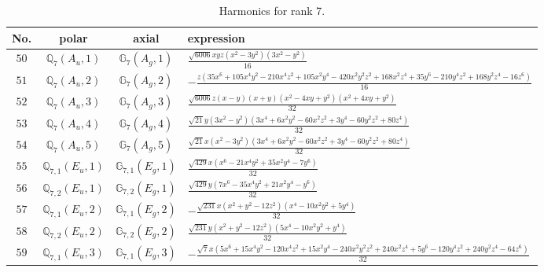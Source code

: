 \documentclass[fleqn,8pt,landscape]{jsarticle}
\begin{document}
\begin{table}[ht!]
\begin{center}
\caption{Harmonics for rank 7.}
\renewcommand{\arraystretch}{1.3}
\begin{tabular}{cccl} \hline \hline
No. & polar & axial & expression \\ \hline
$ 50 $ & $ \mathbb{Q}_{7}(A_{u},1) $ & $ \mathbb{G}_{7}(A_{g},1) $ & $ \frac{\sqrt{6006} x y z \left(x^{2} - 3 y^{2}\right) \left(3 x^{2} - y^{2}\right)}{16} $ \\
$ 51 $ & $ \mathbb{Q}_{7}(A_{u},2) $ & $ \mathbb{G}_{7}(A_{g},2) $ & $ - \frac{z \left(35 x^{6} + 105 x^{4} y^{2} - 210 x^{4} z^{2} + 105 x^{2} y^{4} - 420 x^{2} y^{2} z^{2} + 168 x^{2} z^{4} + 35 y^{6} - 210 y^{4} z^{2} + 168 y^{2} z^{4} - 16 z^{6}\right)}{16} $ \\
$ 52 $ & $ \mathbb{Q}_{7}(A_{u},3) $ & $ \mathbb{G}_{7}(A_{g},3) $ & $ \frac{\sqrt{6006} z \left(x - y\right) \left(x + y\right) \left(x^{2} - 4 x y + y^{2}\right) \left(x^{2} + 4 x y + y^{2}\right)}{32} $ \\
$ 53 $ & $ \mathbb{Q}_{7}(A_{u},4) $ & $ \mathbb{G}_{7}(A_{g},4) $ & $ \frac{\sqrt{21} y \left(3 x^{2} - y^{2}\right) \left(3 x^{4} + 6 x^{2} y^{2} - 60 x^{2} z^{2} + 3 y^{4} - 60 y^{2} z^{2} + 80 z^{4}\right)}{32} $ \\
$ 54 $ & $ \mathbb{Q}_{7}(A_{u},5) $ & $ \mathbb{G}_{7}(A_{g},5) $ & $ \frac{\sqrt{21} x \left(x^{2} - 3 y^{2}\right) \left(3 x^{4} + 6 x^{2} y^{2} - 60 x^{2} z^{2} + 3 y^{4} - 60 y^{2} z^{2} + 80 z^{4}\right)}{32} $ \\
$ 55 $ & $ \mathbb{Q}_{7,1}(E_{u},1) $ & $ \mathbb{G}_{7,1}(E_{g},1) $ & $ \frac{\sqrt{429} x \left(x^{6} - 21 x^{4} y^{2} + 35 x^{2} y^{4} - 7 y^{6}\right)}{32} $ \\
$ 56 $ & $ \mathbb{Q}_{7,2}(E_{u},1) $ & $ \mathbb{G}_{7,2}(E_{g},1) $ & $ \frac{\sqrt{429} y \left(7 x^{6} - 35 x^{4} y^{2} + 21 x^{2} y^{4} - y^{6}\right)}{32} $ \\
$ 57 $ & $ \mathbb{Q}_{7,1}(E_{u},2) $ & $ \mathbb{G}_{7,1}(E_{g},2) $ & $ - \frac{\sqrt{231} x \left(x^{2} + y^{2} - 12 z^{2}\right) \left(x^{4} - 10 x^{2} y^{2} + 5 y^{4}\right)}{32} $ \\
$ 58 $ & $ \mathbb{Q}_{7,2}(E_{u},2) $ & $ \mathbb{G}_{7,2}(E_{g},2) $ & $ \frac{\sqrt{231} y \left(x^{2} + y^{2} - 12 z^{2}\right) \left(5 x^{4} - 10 x^{2} y^{2} + y^{4}\right)}{32} $ \\
$ 59 $ & $ \mathbb{Q}_{7,1}(E_{u},3) $ & $ \mathbb{G}_{7,1}(E_{g},3) $ & $ - \frac{\sqrt{7} x \left(5 x^{6} + 15 x^{4} y^{2} - 120 x^{4} z^{2} + 15 x^{2} y^{4} - 240 x^{2} y^{2} z^{2} + 240 x^{2} z^{4} + 5 y^{6} - 120 y^{4} z^{2} + 240 y^{2} z^{4} - 64 z^{6}\right)}{32} $ \\

\end{tabular}
\end{center}
\end{table}
\end{document}
